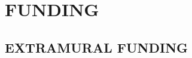 \documentclass[11pt]{article}
\begin{document}
\section*{FUNDING}

\subsection*{EXTRAMURAL FUNDING}
\end{document}
